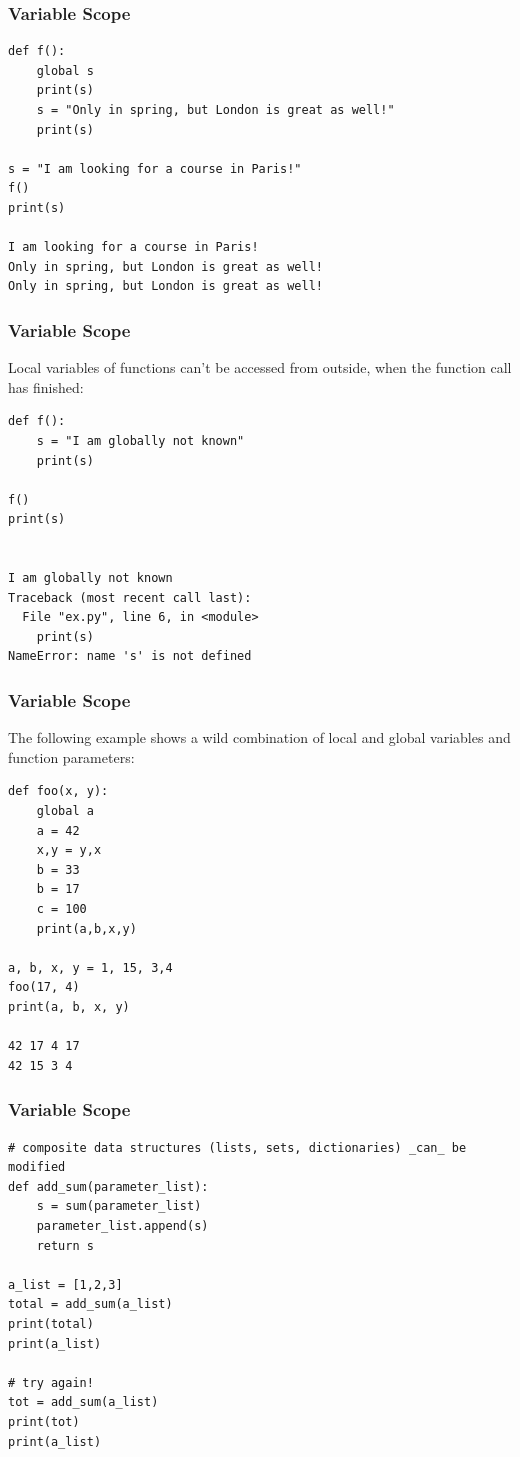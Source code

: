 \begin{frame}[fragile]\frametitle{Variable Scope}

\begin{lstlisting}
def f():
    global s
    print(s)
    s = "Only in spring, but London is great as well!"
    print(s)

s = "I am looking for a course in Paris!"
f()
print(s)

I am looking for a course in Paris!
Only in spring, but London is great as well!
Only in spring, but London is great as well!
\end{lstlisting}

\end{frame}

\begin{frame}[fragile]\frametitle{Variable Scope}
Local variables of functions can't be accessed from outside, when the function call has finished:
\begin{lstlisting}
def f():
    s = "I am globally not known"
    print(s)

f()
print(s)


I am globally not known
Traceback (most recent call last):
  File "ex.py", line 6, in <module>
    print(s)
NameError: name 's' is not defined
\end{lstlisting}
\end{frame}


\begin{frame}[fragile]\frametitle{Variable Scope}
The following example shows a wild combination of local and global variables and function parameters:
\begin{lstlisting}
def foo(x, y):
    global a
    a = 42
    x,y = y,x
    b = 33
    b = 17
    c = 100
    print(a,b,x,y)

a, b, x, y = 1, 15, 3,4 
foo(17, 4)
print(a, b, x, y)

42 17 4 17
42 15 3 4
\end{lstlisting}
\end{frame}



\begin{frame}[fragile]\frametitle{Variable Scope}
\begin{lstlisting}
# composite data structures (lists, sets, dictionaries) _can_ be modified
def add_sum(parameter_list):
    s = sum(parameter_list)
    parameter_list.append(s)
    return s

a_list = [1,2,3]
total = add_sum(a_list)
print(total)
print(a_list)

# try again!
tot = add_sum(a_list)
print(tot)
print(a_list)

\end{lstlisting}
\end{frame}


